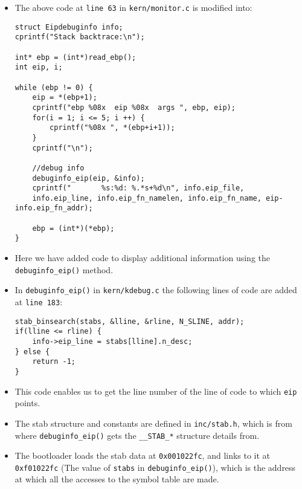 \documentclass[]{article}
\begin{document}
\begin{itemize}
\item
  The above code at \texttt{line 63} in \texttt{kern/monitor.c} is
  modified into:

\begin{verbatim}
struct Eipdebuginfo info;
cprintf("Stack backtrace:\n");

int* ebp = (int*)read_ebp();
int eip, i;

while (ebp != 0) {
    eip = *(ebp+1);
    cprintf("ebp %08x  eip %08x  args ", ebp, eip);
    for(i = 1; i <= 5; i ++) {
        cprintf("%08x ", *(ebp+i+1));
    }
    cprintf("\n");

    //debug info
    debuginfo_eip(eip, &info);
    cprintf("       %s:%d: %.*s+%d\n", info.eip_file,
    info.eip_line, info.eip_fn_namelen, info.eip_fn_name, eip-info.eip_fn_addr);

    ebp = (int*)(*ebp);
}
\end{verbatim}
\item
  Here we have added code to display additional information using the
  \texttt{debuginfo\_eip()} method.
\item
  In \texttt{debuginfo\_eip()} in \texttt{kern/kdebug.c} the following
  lines of code are added at \texttt{line 183}:

\begin{verbatim}
stab_binsearch(stabs, &lline, &rline, N_SLINE, addr);
if(lline <= rline) {
    info->eip_line = stabs[lline].n_desc;
} else {
    return -1;
}
\end{verbatim}
\item
  This code enables us to get the line number of the line of code to
  which \texttt{eip} points.
\item
  The stab structure and constants are defined in \texttt{inc/stab.h},
  which is from where \texttt{debuginfo\_eip()} gets the
  \texttt{\_\_STAB\_*} structure details from.
\item
  The bootloader loads the stab data at \texttt{0x001022fc}, and links
  to it at \texttt{0xf01022fc} (The value of \texttt{stabs} in
  \texttt{debuginfo\_eip()}), which is the address at which all the
  accesses to the symbol table are made.
\end{itemize}
\end{document}
